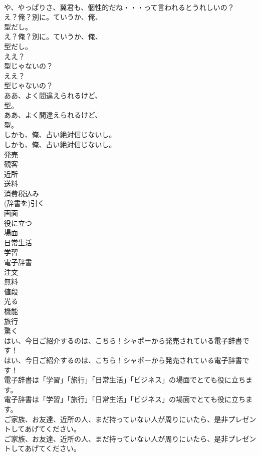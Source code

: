 \documentclass[8pt]{extreport}
\begin{document}
\begin{CJK}{UTF8}{min}
\\	や、やっぱりさ、翼君も、個性的だね・・・って言われるとうれしいの？ 
\\	え？俺？別に。ていうか、俺、
\\	型だし。	
\\	え？俺？別に。ていうか、俺、
\\	型だし。 
\\	ええ？
\\	型じゃないの？	
\\	ええ？
\\	型じゃないの？ 
\\	ああ、よく間違えられるけど、
\\	型。	
\\	ああ、よく間違えられるけど、
\\	型。 
\\	しかも、俺、占い絶対信じないし。	
\\	しかも、俺、占い絶対信じないし。 
\\	発売
\\	観客
\\	近所
\\	送料
\\	消費税込み
\\	(辞書を)引く
\\	画面
\\	役に立つ
\\	場面
\\	日常生活
\\	学習
\\	電子辞書
\\	注文
\\	無料
\\	値段
\\	光る
\\	機能
\\	旅行
\\	驚く
\\	はい、今日ご紹介するのは、こちら！シャポーから発売されている電子辞書です！	
\\	はい、今日ご紹介するのは、こちら！シャポーから発売されている電子辞書です！ 
\\	電子辞書は「学習」「旅行」「日常生活」「ビジネス」の場面でとても役に立ちます。	
\\	電子辞書は「学習」「旅行」「日常生活」「ビジネス」の場面でとても役に立ちます。 
\\	ご家族、お友達、近所の人、まだ持っていない人が周りにいたら、是非プレゼントしてあげてください。	
\\	ご家族、お友達、近所の人、まだ持っていない人が周りにいたら、是非プレゼントしてあげてください。 

\end{CJK}
\end{document}
